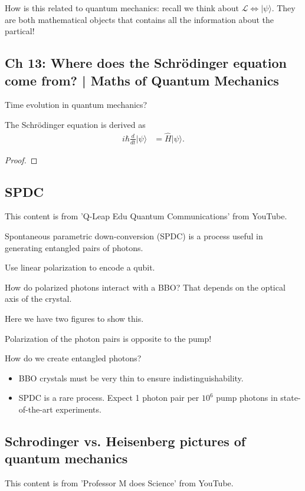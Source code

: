 \documentclass[../../note.tex]{subfiles}
\begin{document}
How is this related to quantum mechanics: recall we think about $\mathcal{L} \Longleftrightarrow \vert \psi \rangle$. They are both mathematical objects that contains all the information about the partical!

\subsection{Ch 13: Where does the Schrödinger equation come from? | Maths of Quantum Mechanics}
Time evolution in quantum mechanics?
\begin{theorem}
  The Schrödinger equation is derived as
  \begin{align}
    i \hbar \frac{d}{d t}\vert \psi \rangle
    &= \hat{H} \vert \psi \rangle.
  \end{align}
\end{theorem}
\begin{proof}
  
\end{proof}

\subsection{SPDC}
This content is from 'Q-Leap Edu Quantum Communications' from YouTube.

Spontaneous parametric down-conversion (SPDC) is a process useful in generating entangled pairs of photons.


Use linear polarization to encode a qubit.


How do polarized photons interact with a BBO? That depends on the optical axis of the crystal.


Here we have two figures to show this.


Polarization of the photon pairs is opposite to the pump!


How do we create entangled photons?


\begin{itemize}
  \item BBO crystals must be very thin to ensure indistinguishability.
  \item SPDC is a rare process. Expect 1 photon pair per $10^6$ pump photons in state-of-the-art experiments.
\end{itemize}

\subsection{Schrodinger vs. Heisenberg pictures of quantum mechanics}
This content is from 'Professor M does Science' from YouTube.
\end{document}

